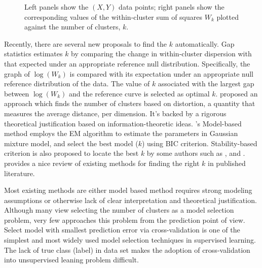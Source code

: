 \documentclass[12pt]{article}
\begin{document}
\begin{figure}
\begin{minipage}{\linewidth}
\begin{minipage}{0.45\linewidth}
  \end{minipage}
\end{minipage}
\caption{Left panels show the $(X,Y)$ data points; right panels
  show the corresponding values of the within-cluster sum of squares $W_k$
plotted against the number of clusters, $k$.}
\label{fig:elbow}
\end{figure}

Recently, there are several new proposals to find the $k$ automatically. Gap
statistics \citep{tibshirani2001estimating} estimates $k$ by comparing the
change in within-cluster dispersion with that expected under an appropriate
reference null distribution. Specifically, the graph of $\log(W_k)$ is
compared with its expectation under an appropriate null reference distribution
of the data. The value of $k$ associated with the largest gap between
$\log(W_k)$ and the reference curve is selected as optimal $k$.
\citet{sugar2003finding} proposed an approach which finds the number of
clusters based on distortion, a quantity that measures the average distance,
per dimension. It's backed by a rigorous theoretical justification based on
information-theoretic ideas.   \citet{fraley2002model}'s Model-based method
employs the EM algorithm to estimate the parameters in Gaussian mixture model,
and select the best model ($k$) using BIC criterion. Stability-based criterion
is also proposed to locate the best $k$ by some authors such as
\citet{ben2001stability}, \citet{wang2010consistent} and
\citet{fang2012selection}. \citet{chiang2010intelligent} provides a nice review
of existing methods for finding the right $k$ in published literature.

Most existing methods are either model based method requires strong modeling
assumptions or otherwise lack of clear interpretation and theoretical justification.
Although many view selecting the number of clusters as a model selection problem, very few
approaches this problem from the prediction point of view. Select model with
smallest prediction error via cross-validation is one of the simplest and most
widely used model selection techniques in supervised learning. The lack of
true class (label) in data set makes the adoption of cross-validation into
unsupervised leaning problem difficult.
\end{document}
